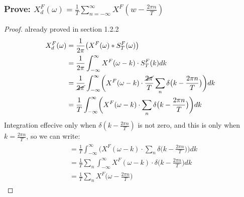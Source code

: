 \documentclass{article}
\begin{document}
\subsubsection{Prove: $X_d^F(\omega)=\frac{1}{T}\sum^\infty_{n=-\infty}X^F(w - \frac{2\pi n}{T})$}
\begin{proof}
    already proved in section 1.2.2
    $ $\newline
    \begin{equation}
        \begin{aligned}
            X_d^F(\omega) & = \frac{1}{2\pi}\big(X^F(\omega) \ast S^F_T (\omega)\big)\\
            & = \frac{1}{2\pi}\int_{-\infty}^{\infty}X^F(\omega-k)\cdot S^F_T(k) dk\\
            & = \frac{1}{\cancel{2\pi}}\int_{-\infty}^{\infty}\biggl(X^F(\omega-k)\cdot \frac{\cancel{2\pi}}{T}\sum_n \delta\big(k-\frac{2\pi n}{T}\big) \biggr)dk\\
            & = \frac{1}{T}\int_{-\infty}^{\infty}\biggl(X^F(\omega-k)\cdot\sum_n \delta\big(k-\frac{2\pi n}{T}\big) \biggr)dk\\
        \end{aligned}
    \end{equation}
    Integration effecive only when $\delta(k-\frac{2\pi n}{T})$ is not zero, and this is only when $k=\frac{2\pi n}{T}$, so we can write:
    \begin{equation}
        \begin{aligned}
            \begin{aligned}
                & = \frac{1}{T}\int_{-\infty}^{\infty}\biggl(X^F(\omega-k)\cdot\sum_n \delta\big(k-\frac{2\pi n}{T}\big) \biggr)dk\\
                & = \frac{1}{T}\sum_n \int_{-\infty}^{\infty}X^F(\omega-k)\cdot \delta\big(k-\frac{2\pi n}{T}\big) dk\\
                & = \frac{1}{T}\sum_n X^F\bigg(\omega - \frac{2\pi n}{T}\bigg)
            \end{aligned}
        \end{aligned}
    \end{equation}
\end{proof}
\end{document}
